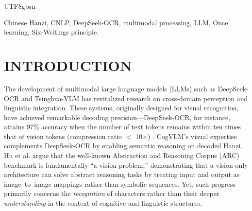 \documentclass[conference]{IEEEtran}
\begin{document}
\begin{CJK*}{UTF8}{gbsn}


\begin{IEEEkeywords}
Chinese Hanzi, CNLP, DeepSeek-OCR, multimodal processing, LLM, Once learning, Six-Writings principle.
\end{IEEEkeywords}

\section{INTRODUCTION}

The development of multimodal large language models (LLMs) such as DeepSeek-OCR \cite{wei2025deepseek} and Tsinghua-VLM \cite{wang2024cogvlm} has revitalized research on cross-domain perception and linguistic integration. These systems, originally designed for visual recognition, have achieved remarkable decoding precision—DeepSeek-OCR, for instance, attains 97\% accuracy when the number of text tokens remains within ten times that of vision tokens (compression ratio $<$ 10×) \cite{wei2025deepseek}. CogVLM's visual expertise complements DeepSeek-OCR by enabling semantic reasoning on decoded Hanzi. Hu et al. \cite{hu2025arc} argue that the well-known Abstraction and Reasoning Corpus (ARC) benchmark is fundamentally “a vision problem,” demonstrating that a vision-only architecture can solve abstract reasoning tasks by treating input and output as image–to–image mappings rather than symbolic sequences. Yet, such progress primarily concerns the \textit{recognition} of characters rather than their deeper \textit{understanding} in the context of cognitive and linguistic structures.


\end{CJK*}
\end{document}
